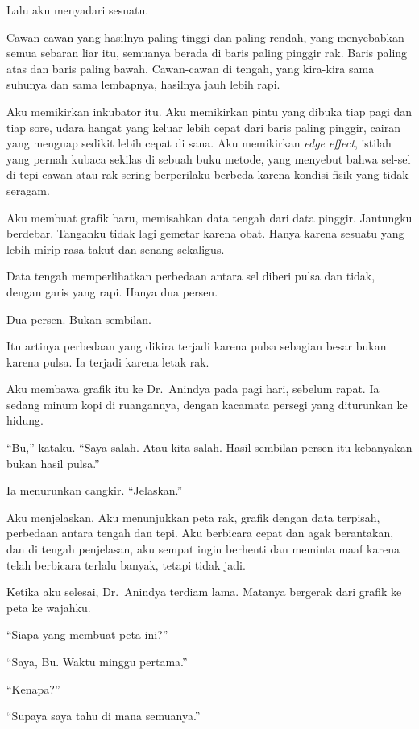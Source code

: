 \documentclass[11pt,twoside,openany]{book}
\makeatletter
\newcommand{\scenebreak}{\par\vspace{0.9em}{\centering\textsc{*\hspace{0.7em}*\hspace{0.7em}*}\par}\vspace{0.9em}\@afterindentfalse\@afterheading}
\makeatother
\begin{document}
Lalu aku menyadari sesuatu.

Cawan-cawan yang hasilnya paling tinggi dan paling rendah, yang menyebabkan semua sebaran liar itu, semuanya berada di baris paling pinggir rak. Baris paling atas dan baris paling bawah. Cawan-cawan di tengah, yang kira-kira sama suhunya dan sama lembapnya, hasilnya jauh lebih rapi.

Aku memikirkan inkubator itu. Aku memikirkan pintu yang dibuka tiap pagi dan tiap sore, udara hangat yang keluar lebih cepat dari baris paling pinggir, cairan yang menguap sedikit lebih cepat di sana. Aku memikirkan \emph{edge effect}, istilah yang pernah kubaca sekilas di sebuah buku metode, yang menyebut bahwa sel-sel di tepi cawan atau rak sering berperilaku berbeda karena kondisi fisik yang tidak seragam.

Aku membuat grafik baru, memisahkan data tengah dari data pinggir. Jantungku berdebar. Tanganku tidak lagi gemetar karena obat. Hanya karena sesuatu yang lebih mirip rasa takut dan senang sekaligus.

Data tengah memperlihatkan perbedaan antara sel diberi pulsa dan tidak, dengan garis yang rapi. Hanya dua persen.

Dua persen. Bukan sembilan.

Itu artinya perbedaan yang dikira terjadi karena pulsa sebagian besar bukan karena pulsa. Ia terjadi karena letak rak.

\scenebreak
Aku membawa grafik itu ke Dr.~Anindya pada pagi hari, sebelum rapat. Ia sedang minum kopi di ruangannya, dengan kacamata persegi yang diturunkan ke hidung.

``Bu,'' kataku. ``Saya salah. Atau kita salah. Hasil sembilan persen itu kebanyakan bukan hasil pulsa.''

Ia menurunkan cangkir. ``Jelaskan.''

Aku menjelaskan. Aku menunjukkan peta rak, grafik dengan data terpisah, perbedaan antara tengah dan tepi. Aku berbicara cepat dan agak berantakan, dan di tengah penjelasan, aku sempat ingin berhenti dan meminta maaf karena telah berbicara terlalu banyak, tetapi tidak jadi.

Ketika aku selesai, Dr.~Anindya terdiam lama. Matanya bergerak dari grafik ke peta ke wajahku.

``Siapa yang membuat peta ini?''

``Saya, Bu. Waktu minggu pertama.''

``Kenapa?''

``Supaya saya tahu di mana semuanya.''
\end{document}

